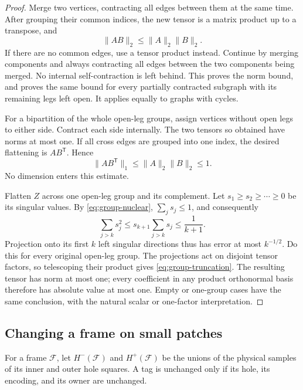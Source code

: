 \documentclass[11pt]{article}
\numberwithin{equation}{section}
\theoremstyle{definition}
\theoremstyle{remark}
\newcommand{\norm}[1]{\lVert #1\rVert}
\begin{document}
\begin{proof}
Merge two vertices, contracting all edges between them at the same time.
After grouping their common indices, the new tensor is a matrix product
up to a transpose, and
\[
  \norm{AB}_2\le\norm{A}_2\norm{B}_2.
\]
If there are no common edges, use a tensor product instead.  Continue by
merging components and always contracting all edges between the two
components being merged.  No internal self-contraction is left behind.
This proves the norm bound, and proves the same bound for every partially
contracted subgraph with its remaining legs left open.  It applies equally
to graphs with cycles.

For a bipartition of the whole open-leg groups, assign vertices without
open legs to either side.  Contract each side internally.  The two tensors
so obtained have norms at most one.  If all cross edges are grouped into
one index, the desired flattening is $AB^{\mathsf T}$.  Hence
\begin{equation}\label{eq:group-nuclear}
  \norm{AB^{\mathsf T}}_1\le\norm{A}_2\norm{B}_2\le1.
\end{equation}
No dimension enters this estimate.

Flatten $Z$ across one open-leg group and its complement.  Let
$s_1\ge s_2\ge\cdots\ge0$ be its singular values.  By
\eqref{eq:group-nuclear}, $\sum_js_j\le1$, and consequently
\[
 \sum_{j>k}s_j^2
     \le s_{k+1}\sum_{j>k}s_j\le\frac{1}{k+1}.
\]
Projection onto its first $k$ left singular directions thus has error at
most $k^{-1/2}$.  Do this for every original open-leg group.  The projections
act on disjoint tensor factors, so telescoping their product gives
\eqref{eq:group-truncation}.  The resulting tensor has norm at most one;
every coefficient in any product orthonormal basis therefore has absolute
value at most one.  Empty or one-group cases have the same conclusion,
with the natural scalar or one-factor interpretation.
\end{proof}

\subsection{Changing a frame on small patches}

For a frame $\mathcal F$, let $H^-(\mathcal F)$ and $H^+(\mathcal F)$ be the
unions of the physical samples of its inner and outer hole squares.  A tag
is unchanged only if its hole, its encoding, and its owner are unchanged.
\end{document}
